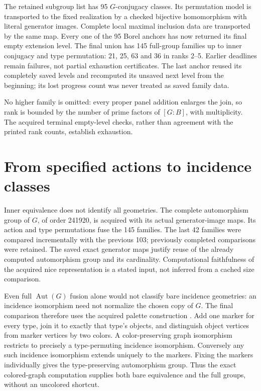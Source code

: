 \documentclass[11pt]{article}
\newcommand{\Aut}{\operatorname{Aut}}\newcommand{\Cor}{\operatorname{Cor}}
\begin{document}
The retained subgroup list has 95 $G$-conjugacy classes. Its permutation
model is transported to the fixed realization by a checked bijective
homomorphism with literal generator images. Complete local maximal
inclusion data are transported by the same map. Every one of the 95
Borel anchors has now returned its final empty extension level.
The final union has 145 full-group families up to inner conjugacy and
type permutation: 21, 25, 63 and 36 in ranks 2--5. Earlier deadlines
remain failures, not partial exhaustion certificates. The last anchor
reused its completely saved levels and recomputed its unsaved next
level from the beginning; its lost progress count was never treated
as saved family data.

No higher family is omitted: every proper panel addition enlarges the
join, so rank is bounded by the number of prime factors of $[G:B]$,
with multiplicity. The acquired terminal empty-level checks, rather
than agreement with the printed rank counts, establish exhaustion.

\section{From specified actions to incidence classes}\label{fusion}
Inner equivalence does not identify all geometries. The complete
automorphism group of $G$, of order 241920, is acquired with its actual
generator-image maps. Its action and type permutations fuse the 145
families. The last 42 families were compared incrementally with the
previous 103; previously completed comparisons were retained. The
saved exact generator maps justify reuse of the already computed
automorphism group and its cardinality. Computational faithfulness of
the acquired nice representation is a stated input, not inferred from
a cached size comparison.

Even full $\Aut(G)$ fusion alone would not classify bare incidence
geometries: an incidence isomorphism need not normalize the chosen
copy of $G$. The final comparison therefore uses the acquired palette
construction \cite{Palette}. Add one marker for every type, join it
to exactly that type's objects, and distinguish object vertices from
marker vertices by two colors. A color-preserving graph isomorphism
restricts to precisely a type-permuting incidence isomorphism.
Conversely any such incidence isomorphism extends uniquely to the
markers. Fixing the markers individually gives the type-preserving
automorphism group. Thus the exact colored-graph computation supplies
both bare equivalence and the full groups, without an uncolored shortcut.
\end{document}

